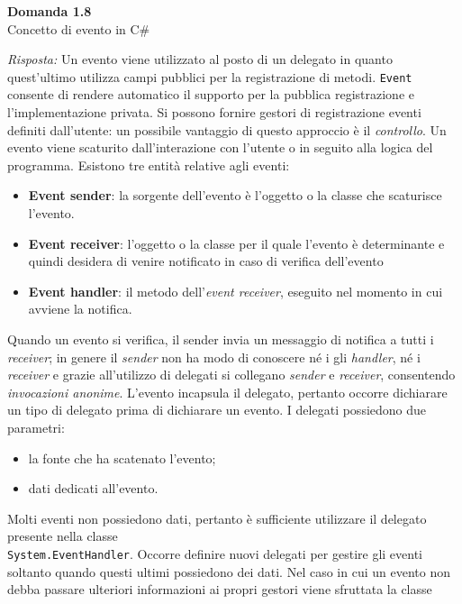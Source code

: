 \documentclass{article}
\newenvironment{problem}[2][Domanda]
    { \begin{mdframed}[backgroundcolor=gray!20] \textbf{#1 #2} \\}
    {  \end{mdframed}}
\newenvironment{solution}
    {\textit{Risposta:}}
    {}
\begin{document}
\begin{problem}{1.8}
Concetto di evento in C\#
\end{problem}
\begin{solution}
Un evento viene utilizzato al posto di un delegato in quanto quest’ultimo utilizza campi pubblici per la registrazione di
metodi.
\newline
\texttt{Event} consente di rendere automatico il supporto per la pubblica registrazione e l’implementazione privata.
\newline
Si possono fornire gestori di registrazione eventi definiti dall’utente: un possibile vantaggio di questo approccio è il
\textit{controllo}.
\newline
Un evento viene scaturito dall’interazione con l’utente o in seguito alla logica del programma.
Esistono tre entità relative agli eventi:
\begin{itemize}
	\item \textbf{Event sender}: la sorgente dell’evento è l’oggetto o la classe che scaturisce l’evento.
	\item \textbf{Event receiver}: l’oggetto o la classe per il quale l’evento è determinante e quindi desidera di venire notificato
   in caso di verifica dell’evento
	\item \textbf{Event handler}: il metodo dell’\textit{event receiver}, eseguito nel momento in cui avviene la notifica.
\end{itemize}
Quando un evento si verifica, il sender invia un messaggio di notifica a tutti i \textit{receiver}; in genere il \textit{sender} non ha modo
di conoscere né i gli \textit{handler}, né i \textit{receiver} e grazie all’utilizzo di delegati si collegano \textit{sender} e \textit{receiver}, consentendo
\textit{invocazioni anonime}.
L’evento incapsula il delegato, pertanto occorre dichiarare un tipo di delegato prima di dichiarare un evento.
I delegati possiedono due parametri:
\begin{itemize}
	\item la fonte che ha scatenato l’evento;
	\item dati dedicati all’evento.
\end{itemize}
Molti eventi non possiedono dati, pertanto è sufficiente utilizzare il delegato presente nella classe
\\\texttt{System.EventHandler}. Occorre definire nuovi delegati per gestire gli eventi soltanto quando questi ultimi possiedono
dei dati.
Nel caso in cui un evento non debba passare ulteriori informazioni ai propri gestori viene sfruttata la classe

\end{solution}
\end{document}
